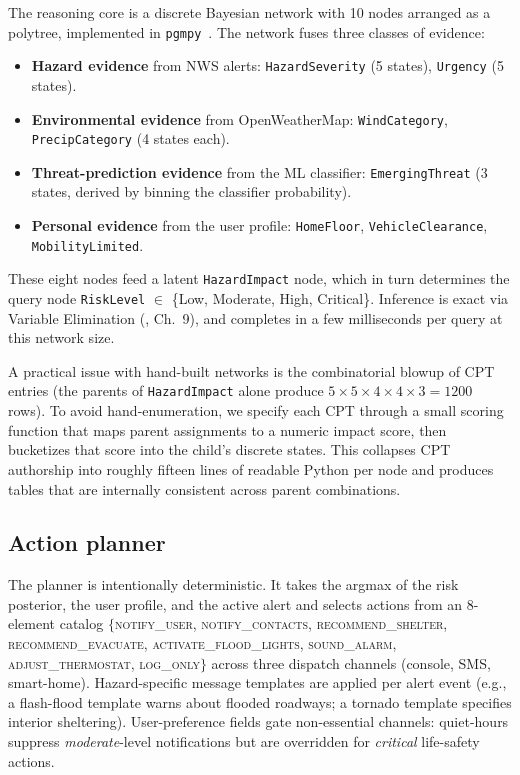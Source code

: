 \documentclass{article}
\theoremstyle{plain}
\theoremstyle{definition}
\theoremstyle{remark}
\begin{document}
The reasoning core is a discrete Bayesian network with 10 nodes
arranged as a polytree, implemented in
\texttt{pgmpy}~\cite{ankan2024pgmpy,ankan2015pgmpy}. The network
fuses three classes of evidence:

\begin{itemize}\itemsep -2pt
\item \textbf{Hazard evidence} from NWS alerts: \texttt{HazardSeverity}
  (5 states), \texttt{Urgency} (5 states).
\item \textbf{Environmental evidence} from OpenWeatherMap:
  \texttt{WindCategory}, \texttt{PrecipCategory} (4 states each).
\item \textbf{Threat-prediction evidence} from the ML classifier:
  \texttt{EmergingThreat} (3 states, derived by binning the classifier
  probability).
\item \textbf{Personal evidence} from the user profile:
  \texttt{HomeFloor}, \texttt{VehicleClearance}, \texttt{MobilityLimited}.
\end{itemize}

These eight nodes feed a latent \texttt{HazardImpact} node, which in
turn determines the query node \texttt{RiskLevel} $\in$
\{Low, Moderate, High, Critical\}. Inference is exact via
Variable Elimination (\citealt{koller2009pgm}, Ch.~9), and completes
in a few milliseconds per query at this network size.

A practical issue with hand-built networks is the combinatorial blowup
of CPT entries (the parents of \texttt{HazardImpact} alone produce
$5\!\times\!5\!\times\!4\!\times\!4\!\times\!3 = 1200$ rows). To avoid
hand-enumeration, we specify each CPT through a small scoring function
that maps parent assignments to a numeric impact score, then bucketizes
that score into the child's discrete states. This collapses CPT
authorship into roughly fifteen lines of readable Python per node and
produces tables that are internally consistent across parent
combinations.

\subsection{Action planner}

The planner is intentionally deterministic. It takes the argmax of the
risk posterior, the user profile, and the active alert and selects
actions from an 8-element catalog
$\{$\textsc{notify\_user}, \textsc{notify\_contacts},
\textsc{recommend\_shelter}, \textsc{recommend\_evacuate},
\textsc{activate\_flood\_lights}, \textsc{sound\_alarm},
\textsc{adjust\_thermostat}, \textsc{log\_only}$\}$ across three
dispatch channels (console, SMS, smart-home). Hazard-specific message
templates are applied per alert event (e.g., a flash-flood template
warns about flooded roadways; a tornado template specifies interior
sheltering). User-preference fields gate non-essential channels:
quiet-hours suppress \emph{moderate}-level notifications but are
overridden for \emph{critical} life-safety actions.
\end{document}
